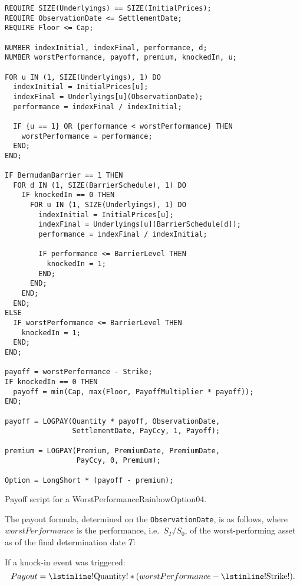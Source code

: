 \begin{listing}[hbt]
\begin{verbatim}
REQUIRE SIZE(Underlyings) == SIZE(InitialPrices);
REQUIRE ObservationDate <= SettlementDate;
REQUIRE Floor <= Cap;

NUMBER indexInitial, indexFinal, performance, d;
NUMBER worstPerformance, payoff, premium, knockedIn, u;

FOR u IN (1, SIZE(Underlyings), 1) DO
  indexInitial = InitialPrices[u];
  indexFinal = Underlyings[u](ObservationDate);
  performance = indexFinal / indexInitial;

  IF {u == 1} OR {performance < worstPerformance} THEN
    worstPerformance = performance;
  END;
END;

IF BermudanBarrier == 1 THEN
  FOR d IN (1, SIZE(BarrierSchedule), 1) DO
    IF knockedIn == 0 THEN
      FOR u IN (1, SIZE(Underlyings), 1) DO
        indexInitial = InitialPrices[u];
        indexFinal = Underlyings[u](BarrierSchedule[d]);
        performance = indexFinal / indexInitial;

        IF performance <= BarrierLevel THEN
          knockedIn = 1;
        END;
      END;
    END;
  END;
ELSE
  IF worstPerformance <= BarrierLevel THEN
    knockedIn = 1;
  END;
END;

payoff = worstPerformance - Strike;
IF knockedIn == 0 THEN
  payoff = min(Cap, max(Floor, PayoffMultiplier * payoff));
END;

payoff = LOGPAY(Quantity * payoff, ObservationDate,
                SettlementDate, PayCcy, 1, Payoff);

premium = LOGPAY(Premium, PremiumDate, PremiumDate,
                 PayCcy, 0, Premium);

Option = LongShort * (payoff - premium);
\end{verbatim}
\caption{Payoff script for a WorstPerformanceRainbowOption04.}
\label{lst:worst_performance_rainbow_option_04}
\end{listing}

The payout formula, determined on the \lstinline!ObservationDate!, is as follows, where
$worstPerformance$ is the performance, i.e.\ $S_T/S_0$, of the worst-performing asset as
of the final determination date $T$:

If a knock-in event was triggered:
\begin{equation*}
  Payout = \text{\lstinline!Quantity!} * (worstPerformance - \text{\lstinline!Strike!}).
\end{equation*}

